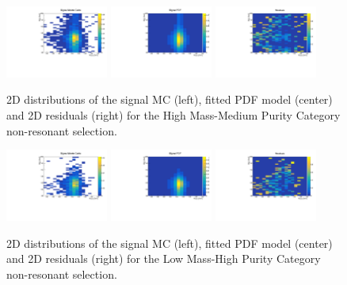 \begin{figure}[thb]
  \centering
\includegraphics[width=0.3\textwidth]{figures/sec-signals/SignalResiduals/h_mc_HM_cat1}\hfil
\includegraphics[width=0.3\textwidth]{figures/sec-signals/SignalResiduals/h_pd_HM_cat1}\hfil
\includegraphics[width=0.3\textwidth]{figures/sec-signals/SignalResiduals/h_re_HM_cat1}\hfil
  \caption{2D distributions of the signal MC (left), fitted PDF model (center) and 2D residuals (right) for the High Mass-Medium Purity Category non-resonant selection.}
  \label{fig:sig_resi_hm_mpc}
\end{figure}

\begin{figure}[thb]
  \centering
\includegraphics[width=0.3\textwidth]{figures/sec-signals/SignalResiduals/h_mc_LM_cat0}\hfil
\includegraphics[width=0.3\textwidth]{figures/sec-signals/SignalResiduals/h_pd_LM_cat0}\hfil
\includegraphics[width=0.3\textwidth]{figures/sec-signals/SignalResiduals/h_re_LM_cat0}\hfil
  \caption{2D distributions of the signal MC (left), fitted PDF model (center) and 2D residuals (right) for the Low Mass-High Purity Category non-resonant selection.}
  \label{fig:sig_resi_lm_hpc}
\end{figure}


